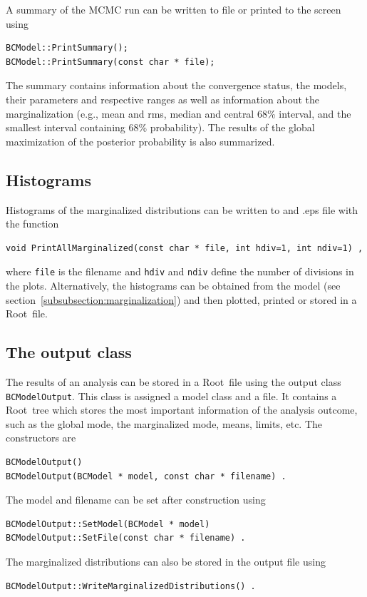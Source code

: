 \documentclass[11pt, a4paper]{article}
\newcommand{\Root}{{\sc Root}}
\begin{document}
A summary of the MCMC run can be written to file or printed to the
screen using
%
\begin{verbatim}
BCModel::PrintSummary();
BCModel::PrintSummary(const char * file);
\end{verbatim}

The summary contains information about the convergence status, the
models, their parameters and respective ranges as well as information
about the marginalization (e.g., mean and rms, median and central 68\%
interval, and the smallest interval containing 68\% probability). The
results of the global maximization of the posterior probability is
also summarized.


\subsection{Histograms}

Histograms of the marginalized distributions can be written to and
.eps file with the function
%
\begin{verbatim}
void PrintAllMarginalized(const char * file, int hdiv=1, int ndiv=1) ,
\end{verbatim}
%
\noindent
where \verb|file| is the filename and \verb|hdiv| and \verb|ndiv|
define the number of divisions in the plots. Alternatively, the
histograms can be obtained from the model (see
section~\ref{subsubsection:marginalization}) and then plotted, printed
or stored in a \Root\ file.


\subsection{The output class}
\label{section:outputclass}

The results of an analysis can be stored in a \Root\ file using the
output class \verb|BCModelOutput|. This class is assigned a model
class and a file. It contains a \Root\ tree which stores the most
important information of the analysis outcome, such as the global
mode, the marginalized mode, means, limits, etc. The constructors are
%
\begin{verbatim}
BCModelOutput()
BCModelOutput(BCModel * model, const char * filename) .
\end{verbatim}
%
The model and filename can be set after construction using
%
\begin{verbatim}
BCModelOutput::SetModel(BCModel * model)
BCModelOutput::SetFile(const char * filename) .
\end{verbatim}
%
The marginalized distributions can also be stored in the output file
using
%
\begin{verbatim}
BCModelOutput::WriteMarginalizedDistributions() .
\end{verbatim}
\end{document}
